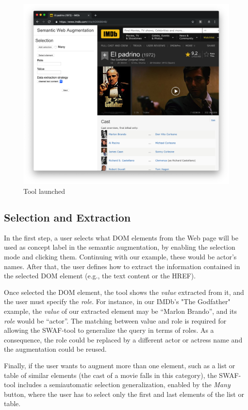 \documentclass[runningheads]{llncs}
\begin{document}
\begin{figure}
  \centering
    \includegraphics[width=0.99\linewidth]{tool/launched2.png}
    \caption{Tool launched}
    \label{fig-swat_launched}
\end{figure}

 \subsection{Selection and Extraction}
 \label{sec-selection}

In the first step, a user selects what DOM elements from the Web page will be used as concept label in the semantic augmentation, by enabling the selection mode and clicking them. Continuing with our example, these would be actor's names. After that, the user defines how to extract the information contained in the selected DOM element (e.g., the text content or the HREF).

Once selected the DOM element, the tool shows the \textit{value} extracted from it, and the user must specify the \emph{role}. For instance, in our IMDb's "The Godfather" example, the \emph{value} of our extracted element may be ``Marlon Brando'', and its \emph{role} would be ``actor''. The matching between value and role is required for allowing the SWAF-tool to generalize the query in terms of roles. As a consequence, the role could be replaced by a different actor or actress name and the augmentation could be reused.

Finally, if the user wants to augment more than one element, such as a list or table of similar elements (the cast of a movie falls in this category), the SWAF-tool includes a semiautomatic selection generalization, enabled by the \textit{Many} button, where the user has to select only the first and last elements of the list or table.
\end{document}
